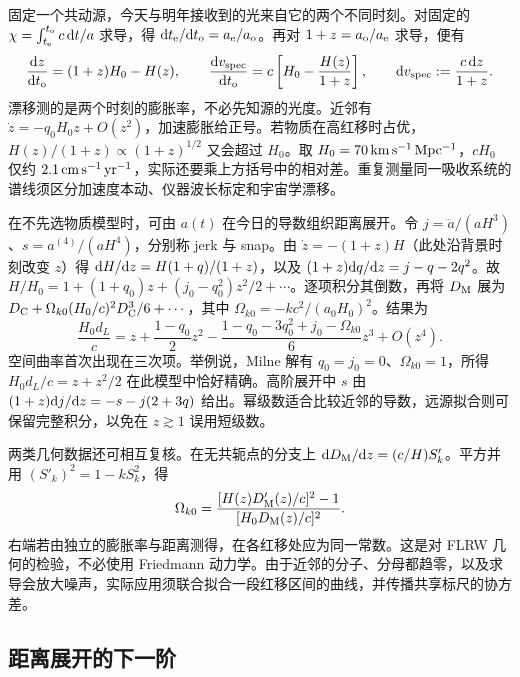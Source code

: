 固定一个共动源，今天与明年接收到的光来自它的两个不同时刻。对固定的 $\chi=\int_{t_{\rm e}}^{t_{\rm o}}c\,\dd t/a$ 求导，得 $\dd t_{\rm e}/\dd t_{\rm o}=a_{\rm e}/a_{\rm o}$。再对 $1+z=a_{\rm o}/a_{\rm e}$ 求导，便有
\begin{equation}\label{eq:cosmo-drift}
 \frac{\dd z}{\dd t_{\rm o}}=(1+z)H_0-H(z),\qquad
 \frac{\dd v_{\rm spec}}{\dd t_{\rm o}}
   =c\left[H_0-\frac{H(z)}{1+z}\right],\qquad
 \dd v_{\rm spec}:=\frac{c\,\dd z}{1+z}.
\end{equation}
漂移测的是两个时刻的膨胀率，不必先知源的光度。近邻有 $\dot z=-q_0H_0z+O(z^2)$，加速膨胀给正号。若物质在高红移时占优，$H(z)/(1+z)\propto(1+z)^{1/2}$ 又会超过 $H_0$。取 $H_0=70\,{\rm km\,s^{-1}\,Mpc^{-1}}$，$cH_0$ 仅约 $2.1\,{\rm cm\,s^{-1}\,yr^{-1}}$，实际还要乘上方括号中的相对差。重复测量同一吸收系统的谱线须区分加速度本动、仪器波长标定和宇宙学漂移。

在不先选物质模型时，可由 $a(t)$ 在今日的导数组织距离展开。令 $j=\dddot a/(aH^3)$、$s=a^{(4)}/(aH^4)$，分别称 jerk 与 snap。由 $\dot z=-(1+z)H$（此处沿背景时刻改变 $z$）得 $\dd H/\dd z=H(1+q)/(1+z)$，以及 $(1+z)\dd q/\dd z=j-q-2q^2$。故 $H/H_0=1+(1+q_0)z+(j_0-q_0^2)z^2/2+\cdots$。逐项积分其倒数，再将 $D_{\rm M}$ 展为 $D_{\rm C}+\Omega_{k0}(H_0/c)^2D_{\rm C}^3/6+\cdots$，其中 $\Omega_{k0}=-kc^2/(a_0H_0)^2$。结果为
\[
 \frac{H_0d_L}{c}=z+\frac{1-q_0}{2}z^2
  -\frac{1-q_0-3q_0^2+j_0-\Omega_{k0}}6z^3+O(z^4).
\]
空间曲率首次出现在三次项。举例说，Milne 解有 $q_0=j_0=0$、$\Omega_{k0}=1$，所得 $H_0d_L/c=z+z^2/2$ 在此模型中恰好精确。高阶展开中 $s$ 由 $(1+z)\dd j/\dd z=-s-j(2+3q)$ 给出。幂级数适合比较近邻的导数，远源拟合则可保留完整积分，以免在 $z\gtrsim1$ 误用短级数。

两类几何数据还可相互复核。在无共轭点的分支上 $\dd D_{\rm M}/\dd z=(c/H)S'_k$。平方并用 $(S'_k)^2=1-k S_k^2$，得
\begin{equation}\label{eq:cosmo-curvtest}
 \Omega_{k0}=\frac{[H(z)D'_{\rm M}(z)/c]^2-1}{[H_0D_{\rm M}(z)/c]^2}.
\end{equation}
右端若由独立的膨胀率与距离测得，在各红移处应为同一常数。这是对 FLRW 几何的检验，不必使用 Friedmann 动力学。由于近邻的分子、分母都趋零，以及求导会放大噪声，实际应用须联合拟合一段红移区间的曲线，并传播共享标尺的协方差。

\subsection{距离展开的下一阶}

